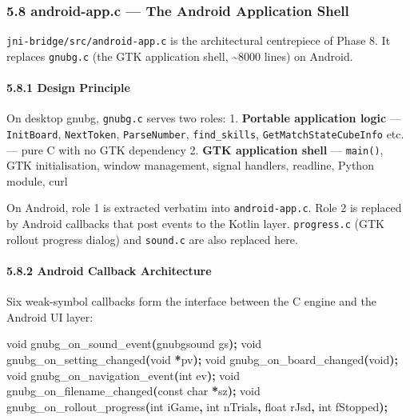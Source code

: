 \documentclass[11pt,a4paper]{article}
\newenvironment{Shaded}{%
  \setlength{\FrameSep}{4pt}%
  \definecolor{shadecolor}{RGB}{245,245,245}%
  \begin{snugshade}\footnotesize
}{\end{snugshade}}
\newcommand{\DataTypeTok}[1]{\textcolor[rgb]{0.13,0.29,0.53}{#1}}
\newcommand{\NormalTok}[1]{#1}
\newcommand{\OperatorTok}[1]{\textcolor[rgb]{0.81,0.36,0.00}{\textbf{#1}}}
\begin{document}
\subsubsection{5.8 android-app.c --- The Android Application
Shell}\label{android-app.c-the-android-application-shell}

\texttt{jni-bridge/src/android-app.c} is the architectural centrepiece
of Phase 8. It replaces \texttt{gnubg.c} (the GTK application shell,
\textasciitilde8000 lines) on Android.

\paragraph{5.8.1 Design Principle}\label{design-principle}

On desktop gnubg, \texttt{gnubg.c} serves two roles: 1. \textbf{Portable
application logic} --- \texttt{InitBoard}, \texttt{NextToken},
\texttt{ParseNumber}, \texttt{find\_skills},
\texttt{GetMatchStateCubeInfo} etc. --- pure C with no GTK dependency 2.
\textbf{GTK application shell} --- \texttt{main()}, GTK initialisation,
window management, signal handlers, readline, Python module, curl

On Android, role 1 is extracted verbatim into \texttt{android-app.c}.
Role 2 is replaced by Android callbacks that post events to the Kotlin
layer. \texttt{progress.c} (GTK rollout progress dialog) and
\texttt{sound.c} are also replaced here.

\paragraph{5.8.2 Android Callback
Architecture}\label{android-callback-architecture}

Six weak-symbol callbacks form the interface between the C engine and
the Android UI layer:

\begin{Shaded}
\begin{Highlighting}[]
\DataTypeTok{void}\NormalTok{ gnubg\_on\_sound\_event}\OperatorTok{(}\NormalTok{gnubgsound gs}\OperatorTok{);}
\DataTypeTok{void}\NormalTok{ gnubg\_on\_setting\_changed}\OperatorTok{(}\DataTypeTok{void} \OperatorTok{*}\NormalTok{pv}\OperatorTok{);}
\DataTypeTok{void}\NormalTok{ gnubg\_on\_board\_changed}\OperatorTok{(}\DataTypeTok{void}\OperatorTok{);}
\DataTypeTok{void}\NormalTok{ gnubg\_on\_navigation\_event}\OperatorTok{(}\DataTypeTok{int}\NormalTok{ ev}\OperatorTok{);}
\DataTypeTok{void}\NormalTok{ gnubg\_on\_filename\_changed}\OperatorTok{(}\DataTypeTok{const} \DataTypeTok{char} \OperatorTok{*}\NormalTok{sz}\OperatorTok{);}
\DataTypeTok{void}\NormalTok{ gnubg\_on\_rollout\_progress}\OperatorTok{(}\DataTypeTok{int}\NormalTok{ iGame}\OperatorTok{,} \DataTypeTok{int}\NormalTok{ nTrials}\OperatorTok{,} \DataTypeTok{float}\NormalTok{ rJsd}\OperatorTok{,} \DataTypeTok{int}\NormalTok{ fStopped}\OperatorTok{);}
\end{Highlighting}
\end{Shaded}
\end{document}
